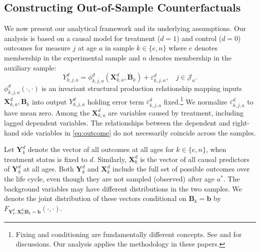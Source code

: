 \subsection{Constructing Out-of-Sample Counterfactuals}\label{section:just}

We now present our analytical framework and its underlying assumptions. Our analysis is based on a causal model for treatment ($d=1$) and control ($d=0$) outcomes for measure $j$ at age $a$ in sample $k \in \{e,n\}$ where $e$ denotes membership in the experimental sample and $n$ denotes membership in the auxiliary sample:
\begin{equation}\label{eq:outcome}
Y^d_{k,j,a} = \phi^d_{k,j,a} (\bm{X}^d_{k,a}, \bm{B}_k) + \varepsilon^d_{k,j,a}, \quad j \in \mathcal{J}_a.
\end{equation}
$\phi^d_{k,j,a}\left( \cdot, \cdot \right)$ is an invariant structural production relationship mapping inputs $\bm{X}^d_{k,a}, \bm{B}_k$ into output $Y^d_{k,j,a}$ holding error term $\varepsilon^d_{k,j,a}$ fixed.\footnote{Fixing and conditioning are fundamentally different concepts. See \cite{Haavelmo_1943_Econometrica} and \citet{Heckman_Pinto_2015_EconometTheory} for discussions. Our analysis applies the methodology in these papers.} We normalize $\varepsilon^d_{k,j,a}$ to have mean zero. Among the $\bm{X}^d_{k,a}$ are variables caused by treatment, including lagged dependent variables. The relationships between the dependent and right-hand side variables in \eqref{eq:outcome} do not necessarily coincide across the samples.

Let $\bm{Y}_k^d$ denote the vector of all outcomes at all ages for $k \in \{e, n \}$, when treatment status is fixed to $d$. Similarly, $\bm{X}_k^d$ is the vector of all causal predictors of $\bm{Y}_k^d$ at all ages. Both $\bm{Y}_k^d$ and $\bm{X}_k^d$ include the full set of possible outcomes over the life cycle, even though they are not sampled (observed) after age $a^*$. The background variables may have different distributions in the two samples. We denote the joint distribution of these vectors conditional on $\bm{B}_k = \bm{b}$ by $F_{\bm{Y}_k^d, \bm{X}_k^d | \bm{B}_k = \bm{b}}(\cdot,\cdot)$.

